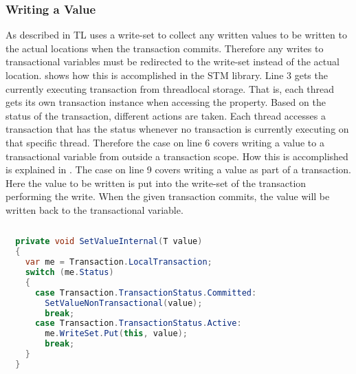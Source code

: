 \subsubsection{Writing a Value}
\label{sec:stm_imple_internal_detials_write}
As described in  TL uses a write-set to collect any written values to be written to the actual locations when the transaction commits. Therefore any writes to transactional variables must be redirected to the write-set instead of the actual location.  shows how this is accomplished in the \ac{STM} library. Line 3 gets the currently executing transaction from threadlocal storage. That is, each thread gets its own transaction instance when accessing the  property. Based on the status of the transaction, different actions are taken. Each thread accesses a transaction that has the status  whenever no transaction is currently executing on that specific thread. Therefore the case on line 6 covers writing a value to a transactional variable from outside a transaction scope. How this is accomplished is explained in . The case on line 9 covers writing a value as part of a transaction. Here the value to be written is put into the write-set of the transaction performing the write. When the given transaction commits, the value will be written back to the transactional variable.

\begin{lstlisting}[label=lst:library_write_value,
  caption={Writing to a Transactional Variable},
  language=Java,  
  showspaces=false,
  showtabs=false,
  breaklines=true,
  showstringspaces=false,
  breakatwhitespace=true,
  commentstyle=\color{greencomments},
  keywordstyle=\color{bluekeywords},
  stringstyle=\color{redstrings},
  morekeywords={atomic, retry, orElse, var, get, set}]  % Start your code-block
  
  private void SetValueInternal(T value)
  {
    var me = Transaction.LocalTransaction;
    switch (me.Status)
    {
      case Transaction.TransactionStatus.Committed:
        SetValueNonTransactional(value);
        break;
      case Transaction.TransactionStatus.Active:
        me.WriteSet.Put(this, value);
        break;
    }
  }
\end{lstlisting}


